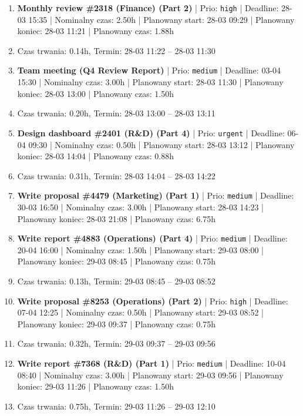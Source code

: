 {\begin{enumerate}
  \item [\textbf{14618}] \textbf{Monthly review \#2318 (Finance) (Part 2)} | Prio: \texttt{high} | Deadline: 28-03 15:35 | Nominalny czas: 2.50h | Planowany start: 28-03 09:29 | Planowany koniec: 28-03 11:21 | Planowany czas: 1.88h
  \item [\textbf{PRZERWA}] Czas trwania: 0.14h, Termin: 28-03 11:22 -- 28-03 11:30
  \item [\textbf{14635}] \textbf{Team meeting (Q4 Review Report)} | Prio: \texttt{medium} | Deadline: 03-04 15:30 | Nominalny czas: 3.00h | Planowany start: 28-03 11:30 | Planowany koniec: 28-03 13:00 | Planowany czas: 1.50h
  \item [\textbf{PRZERWA}] Czas trwania: 0.20h, Termin: 28-03 13:00 -- 28-03 13:11
  \item [\textbf{14603}] \textbf{Design dashboard \#2401 (R\&D) (Part 4)} | Prio: \texttt{urgent} | Deadline: 06-04 09:30 | Nominalny czas: 0.50h | Planowany start: 28-03 13:12 | Planowany koniec: 28-03 14:04 | Planowany czas: 0.88h
  \item [\textbf{PRZERWA}] Czas trwania: 0.31h, Termin: 28-03 14:04 -- 28-03 14:22
  \item [\textbf{14660}] \textbf{Write proposal \#4479 (Marketing) (Part 1)} | Prio: \texttt{medium} | Deadline: 30-03 16:50 | Nominalny czas: 3.00h | Planowany start: 28-03 14:23 | Planowany koniec: 28-03 21:08 | Planowany czas: 6.75h
  \item [\textbf{14651}] \textbf{Write report \#4883 (Operations) (Part 4)} | Prio: \texttt{medium} | Deadline: 20-04 16:00 | Nominalny czas: 1.50h | Planowany start: 29-03 08:00 | Planowany koniec: 29-03 08:45 | Planowany czas: 0.75h
  \item [\textbf{PRZERWA}] Czas trwania: 0.13h, Termin: 29-03 08:45 -- 29-03 08:52
  \item [\textbf{14614}] \textbf{Write proposal \#8253 (Operations) (Part 2)} | Prio: \texttt{high} | Deadline: 07-04 12:25 | Nominalny czas: 0.50h | Planowany start: 29-03 08:52 | Planowany koniec: 29-03 09:37 | Planowany czas: 0.75h
  \item [\textbf{PRZERWA}] Czas trwania: 0.32h, Termin: 29-03 09:37 -- 29-03 09:56
  \item [\textbf{14633}] \textbf{Write report \#7368 (R\&D) (Part 1)} | Prio: \texttt{medium} | Deadline: 10-04 08:40 | Nominalny czas: 3.00h | Planowany start: 29-03 09:56 | Planowany koniec: 29-03 11:26 | Planowany czas: 1.50h
  \item [\textbf{PRZERWA}] Czas trwania: 0.75h, Termin: 29-03 11:26 -- 29-03 12:10

\end{enumerate}}
